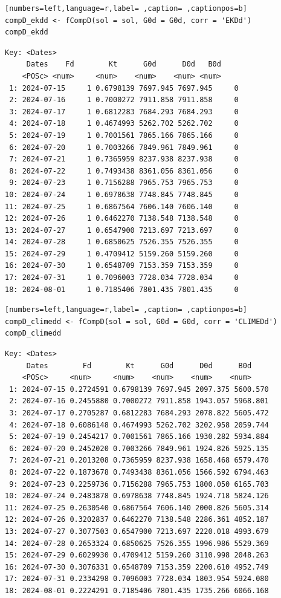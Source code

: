 \begin{itemize}
\begin{lstlisting}[numbers=left,language=r,label= ,caption= ,captionpos=b]
compD_ekdd <- fCompD(sol = sol, G0d = G0d, corr = 'EKDd')
compD_ekdd
\end{lstlisting}

\begin{verbatim}
Key: <Dates>
	 Dates    Fd        Kt      G0d      D0d   B0d
	<POSc> <num>     <num>    <num>    <num> <num>
 1: 2024-07-15     1 0.6798139 7697.945 7697.945     0
 2: 2024-07-16     1 0.7000272 7911.858 7911.858     0
 3: 2024-07-17     1 0.6812283 7684.293 7684.293     0
 4: 2024-07-18     1 0.4674993 5262.702 5262.702     0
 5: 2024-07-19     1 0.7001561 7865.166 7865.166     0
 6: 2024-07-20     1 0.7003266 7849.961 7849.961     0
 7: 2024-07-21     1 0.7365959 8237.938 8237.938     0
 8: 2024-07-22     1 0.7493438 8361.056 8361.056     0
 9: 2024-07-23     1 0.7156288 7965.753 7965.753     0
10: 2024-07-24     1 0.6978638 7748.845 7748.845     0
11: 2024-07-25     1 0.6867564 7606.140 7606.140     0
12: 2024-07-26     1 0.6462270 7138.548 7138.548     0
13: 2024-07-27     1 0.6547900 7213.697 7213.697     0
14: 2024-07-28     1 0.6850625 7526.355 7526.355     0
15: 2024-07-29     1 0.4709412 5159.260 5159.260     0
16: 2024-07-30     1 0.6548709 7153.359 7153.359     0
17: 2024-07-31     1 0.7096003 7728.034 7728.034     0
18: 2024-08-01     1 0.7185406 7801.435 7801.435     0
\end{verbatim}

\begin{lstlisting}[numbers=left,language=r,label= ,caption= ,captionpos=b]
compD_climedd <- fCompD(sol = sol, G0d = G0d, corr = 'CLIMEDd')
compD_climedd
\end{lstlisting}

\begin{verbatim}
Key: <Dates>
	 Dates        Fd        Kt      G0d      D0d      B0d
	<POSc>     <num>     <num>    <num>    <num>    <num>
 1: 2024-07-15 0.2724591 0.6798139 7697.945 2097.375 5600.570
 2: 2024-07-16 0.2455880 0.7000272 7911.858 1943.057 5968.801
 3: 2024-07-17 0.2705287 0.6812283 7684.293 2078.822 5605.472
 4: 2024-07-18 0.6086148 0.4674993 5262.702 3202.958 2059.744
 5: 2024-07-19 0.2454217 0.7001561 7865.166 1930.282 5934.884
 6: 2024-07-20 0.2452020 0.7003266 7849.961 1924.826 5925.135
 7: 2024-07-21 0.2013208 0.7365959 8237.938 1658.468 6579.470
 8: 2024-07-22 0.1873678 0.7493438 8361.056 1566.592 6794.463
 9: 2024-07-23 0.2259736 0.7156288 7965.753 1800.050 6165.703
10: 2024-07-24 0.2483878 0.6978638 7748.845 1924.718 5824.126
11: 2024-07-25 0.2630540 0.6867564 7606.140 2000.826 5605.314
12: 2024-07-26 0.3202837 0.6462270 7138.548 2286.361 4852.187
13: 2024-07-27 0.3077503 0.6547900 7213.697 2220.018 4993.679
14: 2024-07-28 0.2653324 0.6850625 7526.355 1996.986 5529.369
15: 2024-07-29 0.6029930 0.4709412 5159.260 3110.998 2048.263
16: 2024-07-30 0.3076331 0.6548709 7153.359 2200.610 4952.749
17: 2024-07-31 0.2334298 0.7096003 7728.034 1803.954 5924.080
18: 2024-08-01 0.2224291 0.7185406 7801.435 1735.266 6066.168
\end{verbatim}


\end{itemize}
